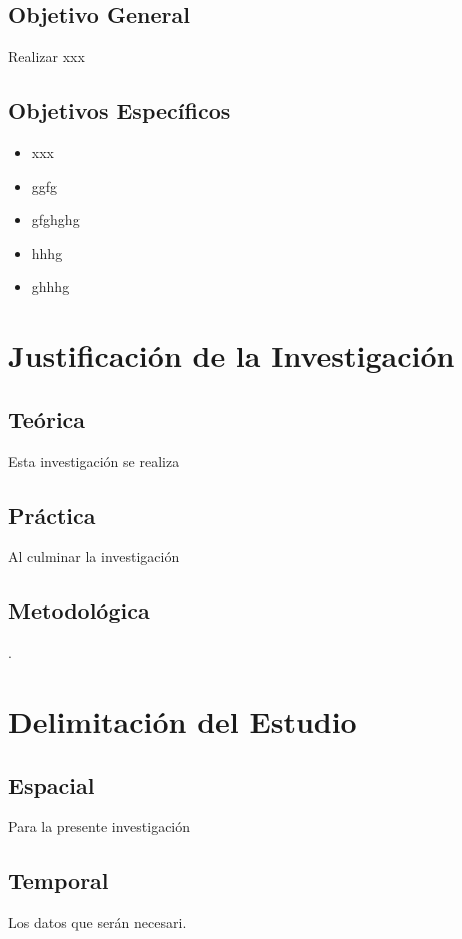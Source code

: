 \subsection{Objetivo General}
\newcommand{\ObjetivoGeneral}{
Realizar xxx
}
\ObjetivoGeneral
\subsection{Objetivos Espec\'{i}ficos}
\newcommand{\Objone}{
xxx
}
\newcommand{\Objtwo}{
ggfg
}
\newcommand{\Objthree}{
gfghghg
}
\newcommand{\Objfour}{
hhhg
}
\newcommand{\Objfive}{
ghhhg
}

\begin{itemize}
	\item {\Objone}
	\item {\Objtwo}
	\item {\Objthree}
	\item {\Objfour}
	\item {\Objfive}
\end{itemize}

\section{Justificación de la Investigación}

\subsection{Teórica}
Esta investigación se realiza 

\subsection{Práctica}
Al culminar la investigación 

\subsection{Metodológica}. 

\section{Delimitación del Estudio}

\subsection{Espacial}
Para la presente investigación 

\subsection{Temporal}
Los datos que serán necesari. 

